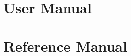 \documentclass[]{book}
\begin{document}
\part{User Manual}



\part{Reference Manual}





\printindex
\end{document}
